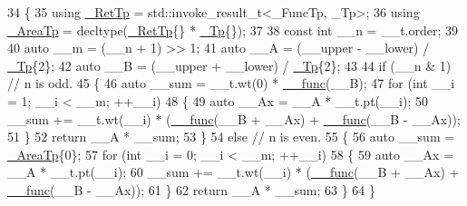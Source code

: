 \begin{DoxyCode}
34     \{
35       \textcolor{keyword}{using} \hyperlink{namespace____gnu__cxx_a886e03ece3d53ff7fa6c098a40f93fa5}{\_RetTp} = std::invoke\_result\_t<\_FuncTp, \_Tp>;
36       \textcolor{keyword}{using} \hyperlink{namespace____gnu__cxx_ae97a51b75e19c30f48d27fac4664de6e}{\_AreaTp} = decltype(\hyperlink{namespace____gnu__cxx_a886e03ece3d53ff7fa6c098a40f93fa5}{\_RetTp}\{\} * \hyperlink{namespace____gnu__cxx_a3b19a9c800ca194374ef9172290f7d79}{\_Tp}\{\});
37 
38       \textcolor{keyword}{const} \textcolor{keywordtype}{int} \_\_n = \_\_t.order;
39 
40       \textcolor{keyword}{auto} \_\_m = (\_\_n + 1) >> 1;
41       \textcolor{keyword}{auto} \_\_A = (\_\_upper - \_\_lower) / \hyperlink{namespace____gnu__cxx_a3b19a9c800ca194374ef9172290f7d79}{\_Tp}\{2\};
42       \textcolor{keyword}{auto} \_\_B = (\_\_upper + \_\_lower) / \hyperlink{namespace____gnu__cxx_a3b19a9c800ca194374ef9172290f7d79}{\_Tp}\{2\};
43 
44       \textcolor{keywordflow}{if} (\_\_n & 1) \textcolor{comment}{// n is odd.}
45         \{
46           \textcolor{keyword}{auto} \_\_sum = \_\_t.wt(0) * \hyperlink{namespace____gnu__cxx_af2b2f0c7a2ae72b922b1afefae5a65b2}{\_\_func}(\_\_B);
47           \textcolor{keywordflow}{for} (\textcolor{keywordtype}{int} \_\_i = 1; \_\_i < \_\_m; ++\_\_i)
48             \{
49               \textcolor{keyword}{auto} \_\_Ax = \_\_A * \_\_t.pt(\_\_i);
50               \_\_sum += \_\_t.wt(\_\_i) * (\hyperlink{namespace____gnu__cxx_af2b2f0c7a2ae72b922b1afefae5a65b2}{\_\_func}(\_\_B + \_\_Ax) + \hyperlink{namespace____gnu__cxx_af2b2f0c7a2ae72b922b1afefae5a65b2}{\_\_func}(\_\_B - \_\_Ax));
51             \}
52           \textcolor{keywordflow}{return} \_\_A * \_\_sum;
53         \}
54       \textcolor{keywordflow}{else} \textcolor{comment}{// n is even.}
55         \{
56           \textcolor{keyword}{auto} \_\_sum = \hyperlink{namespace____gnu__cxx_ae97a51b75e19c30f48d27fac4664de6e}{\_AreaTp}\{0\};
57           \textcolor{keywordflow}{for} (\textcolor{keywordtype}{int} \_\_i = 0; \_\_i < \_\_m; ++\_\_i)
58             \{
59               \textcolor{keyword}{auto} \_\_Ax = \_\_A * \_\_t.pt(\_\_i);
60               \_\_sum += \_\_t.wt(\_\_i) * (\hyperlink{namespace____gnu__cxx_af2b2f0c7a2ae72b922b1afefae5a65b2}{\_\_func}(\_\_B + \_\_Ax) + \hyperlink{namespace____gnu__cxx_af2b2f0c7a2ae72b922b1afefae5a65b2}{\_\_func}(\_\_B - \_\_Ax));
61             \}
62           \textcolor{keywordflow}{return} \_\_A * \_\_sum;
63         \}
64     \}
\end{DoxyCode}
\mbox{\label{namespace____gnu__cxx_a6a28a325aceb8d1e4e70d68b1cdeb156}} 

